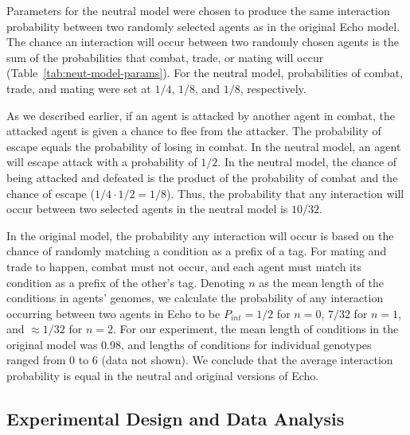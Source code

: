 Parameters for the neutral model were chosen to produce the same
interaction probability between two randomly selected agents 
as in the original Echo model.  The chance an interaction will
occur between two randomly chosen agents is the sum of the
probabilities that combat, trade, or mating will occur
(Table~\ref{tab:neut-model-params}).  For the neutral 
model, probabilities of combat, trade, and mating were set at $1/4$,
$1/8$, and $1/8$, respectively.

As we described earlier, if an agent is attacked by another agent in
combat, the attacked agent is given a chance to flee from the
attacker.  The probability of escape equals the probability of losing
in combat.  In the neutral model, an agent will escape attack with a
probability of $1/2$.  In the neutral model, the chance of
being attacked and defeated is the product of the probability of
combat and the chance of escape ($1/4 \cdot 1/2 = 1/8$).  Thus, the
 probability that any interaction will occur between two selected 
agents in the neutral model is $10/32$.

In the original model, the probability any interaction will occur is
based on the chance of randomly matching a condition as a prefix of a
tag.  For mating and trade to happen, combat must not occur,
and each agent must match its condition as a prefix of the other's tag.
Denoting $n$ as the mean length of the conditions in agents' genomes,
we calculate the probability of any interaction occurring between two
agents in Echo to be $P_{int} = 1/2$ for $n=0$, $7/32$
for $n=1$, and $\approx 1/32$ for $n=2$.  For our experiment,
the mean length of conditions in the original model was 0.98, and
lengths of conditions for individual genotypes ranged from 0 to 6
(data not shown).  We conclude that the average interaction
probability is equal in the neutral and original versions of Echo.

\subsection{Experimental Design and Data Analysis}
\label{data-analysis}

